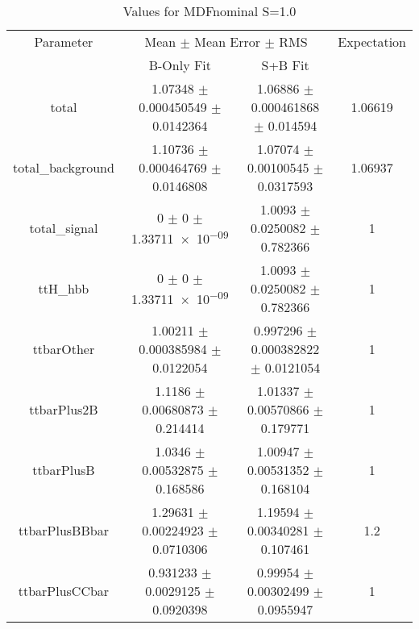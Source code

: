 \begin{table}
\centering
\caption{Values for MDFnominal S=1.0}
\begin{tabular}{cccc}
\toprule
Parameter & \multicolumn{2}{c}{Mean $\pm$ Mean Error $\pm$ RMS} & Expectation\\
 & B-Only Fit & S+B Fit & \\
\midrule
total & \num{1.07348} $\pm$ \num{0.000450549} $\pm$ \num{0.0142364} & \num{1.06886} $\pm$ \num{0.000461868} $\pm$ \num{0.014594} & \num{1.06619}\\
total\_background & \num{1.10736} $\pm$ \num{0.000464769} $\pm$ \num{0.0146808} & \num{1.07074} $\pm$ \num{0.00100545} $\pm$ \num{0.0317593} & \num{1.06937}\\
total\_signal & \num{0} $\pm$ \num{0} $\pm$ \num{1.33711e-09} & \num{1.0093} $\pm$ \num{0.0250082} $\pm$ \num{0.782366} & \num{1}\\
ttH\_hbb & \num{0} $\pm$ \num{0} $\pm$ \num{1.33711e-09} & \num{1.0093} $\pm$ \num{0.0250082} $\pm$ \num{0.782366} & \num{1}\\
ttbarOther & \num{1.00211} $\pm$ \num{0.000385984} $\pm$ \num{0.0122054} & \num{0.997296} $\pm$ \num{0.000382822} $\pm$ \num{0.0121054} & \num{1}\\
ttbarPlus2B & \num{1.1186} $\pm$ \num{0.00680873} $\pm$ \num{0.214414} & \num{1.01337} $\pm$ \num{0.00570866} $\pm$ \num{0.179771} & \num{1}\\
ttbarPlusB & \num{1.0346} $\pm$ \num{0.00532875} $\pm$ \num{0.168586} & \num{1.00947} $\pm$ \num{0.00531352} $\pm$ \num{0.168104} & \num{1}\\
ttbarPlusBBbar & \num{1.29631} $\pm$ \num{0.00224923} $\pm$ \num{0.0710306} & \num{1.19594} $\pm$ \num{0.00340281} $\pm$ \num{0.107461} & \num{1.2}\\
ttbarPlusCCbar & \num{0.931233} $\pm$ \num{0.0029125} $\pm$ \num{0.0920398} & \num{0.99954} $\pm$ \num{0.00302499} $\pm$ \num{0.0955947} & \num{1}\\
\bottomrule
\end{tabular}
\end{table}